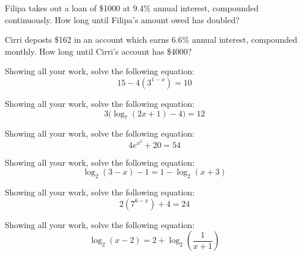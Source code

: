 \documentclass[12pt,letterpaper]{exam}
\begin{document}
\begin{questions}
\newpage
\question[10] Filipa takes out a loan of \$1000 at 9.4\% annual interest, compounded continuously. How long until Filipa's amount owed has doubled?



\newpage
\question[10] Cirri deposts \$162 in an account which earns 6.6\% annual interest, compounded monthly. How long until Cirri's account has \$4000?



\newpage
\question[10] Showing all your work, solve the following equation:
	\[
	15 - 4(3^{1-x})= 10
	\]



\newpage
\question[10] Showing all your work, solve the following equation:
	\[
	3 \big( \log_7(2x + 1) - 4 \big)= 12
	\]



\newpage
\question[10] Showing all your work, solve the following equation:
	\[
	4 e^{x^2} + 20= 54
	\]



\newpage
\question[10] Showing all your work, solve the following equation:
	\[
	\log_2(3 - x) - 1= 1 - \log_2(x + 3)
	\]



\newpage
\question[10] Showing all your work, solve the following equation:
	\[
	2 (7^{6 - x}) + 4= 24
	\]



\newpage
\question[10] Showing all your work, solve the following equation:
	\[
	\log_2(x - 2)= 2 + \log_2 \left( \dfrac{1}{x + 1} \right)
	\]


\end{questions}
\end{document}
